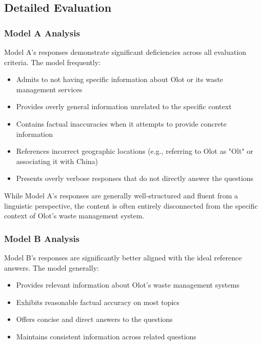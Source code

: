 \subsection{Detailed Evaluation}

\subsubsection{Model A Analysis}

Model A's responses demonstrate significant deficiencies across all evaluation criteria. The model frequently:

\begin{itemize}
    \item Admits to not having specific information about Olot or its waste management services
    \item Provides overly general information unrelated to the specific context
    \item Contains factual inaccuracies when it attempts to provide concrete information
    \item References incorrect geographic locations (e.g., referring to Olot as "Olt" or associating it with China)
    \item Presents overly verbose responses that do not directly answer the questions
\end{itemize}

While Model A's responses are generally well-structured and fluent from a linguistic perspective, the content is often entirely disconnected from the specific context of Olot's waste management system.

\subsubsection{Model B Analysis}

Model B's responses are significantly better aligned with the ideal reference answers. The model generally:

\begin{itemize}
    \item Provides relevant information about Olot's waste management systems
    \item Exhibits reasonable factual accuracy on most topics
    \item Offers concise and direct answers to the questions
    \item Maintains consistent information across related questions
\end{itemize}

